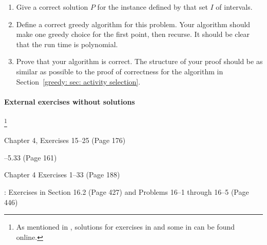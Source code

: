 \begin{enumerate}[label=\alph*]
\item
  Give a correct solution $P$ for the %
  instance defined by that set $I$ of intervals.
\item
  Define a correct greedy algorithm for this problem.
  Your algorithm should make one greedy choice for the first point,
  then recurse.
  It should be clear that the run time is polynomial.
\item
  Prove that your algorithm is correct.
  The structure of your proof should be as similar as possible
  to the proof of correctness for the 
  algorithm in Section~\ref{greedy: sec: activity selection}.
\end{enumerate}


\paragraph{External exercises without solutions}\!\!\!\!\!\footnote
{As mentioned in , solutions for exercises in \KT and some in \CLRS can be found online.}

\begin{mylist}[-]
\item \JE Chapter 4, Exercises 15--25 (Page 176)
\item {}--5.33 (Page 161)
\item \KT Chapter 4 Exercises 1--33 (Page 188)
\item \CLRS: Exercises in Section 16.2 (Page 427) and Problems 16--1 through 16--5 (Page 446)
 \end{mylist}
 

